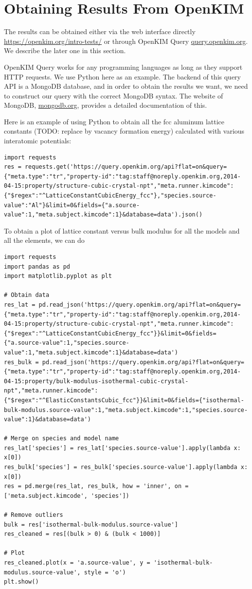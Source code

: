 \documentclass[%
 reprint,
 nofootinbib,
 amsmath,amssymb,
 aps,
]{revtex4-1}
\begin{document}
\section{Obtaining Results From OpenKIM}
\label{app:data}
The results can be obtained either via the web interface directly \url{https://openkim.org/intro-tests/} or through OpenKIM Query \url{query.openkim.org}.
We describe the later one in this section.

OpenKIM Query works for any programming languages as long as they support HTTP requests.
We use Python here as an example.
The backend of this query API is a MongoDB database, and in order to obtain the results we want, we need to construct our query with the correct MongoDB syntax.
The website of MongoDB, \url{mongodb.org}, provides a detailed documentation of this.

Here is an example of using Python to obtain all the fcc aluminum lattice constants (TODO: replace by vacancy formation energy) calculated with various interatomic potentials:
\begin{lstlisting}
import requests
res = requests.get('https://query.openkim.org/api?flat=on&query={"meta.type":"tr","property-id":"tag:staff@noreply.openkim.org,2014-04-15:property/structure-cubic-crystal-npt","meta.runner.kimcode":{"$regex":"^LatticeConstantCubicEnergy_fcc"},"species.source-value":"Al"}&limit=0&fields={"a.source-value":1,"meta.subject.kimcode":1}&database=data').json()
\end{lstlisting}

To obtain a plot of lattice constant versus bulk modulus for all the models and all the elements, we can do
\begin{lstlisting}
import requests
import pandas as pd
import matplotlib.pyplot as plt

# Obtain data
res_lat = pd.read_json('https://query.openkim.org/api?flat=on&query={"meta.type":"tr","property-id":"tag:staff@noreply.openkim.org,2014-04-15:property/structure-cubic-crystal-npt","meta.runner.kimcode":{"$regex":"^LatticeConstantCubicEnergy_fcc"}}&limit=0&fields={"a.source-value":1,"species.source-value":1,"meta.subject.kimcode":1}&database=data')
res_bulk = pd.read_json('https://query.openkim.org/api?flat=on&query={"meta.type":"tr","property-id":"tag:staff@noreply.openkim.org,2014-04-15:property/bulk-modulus-isothermal-cubic-crystal-npt","meta.runner.kimcode":{"$regex":"^ElasticConstantsCubic_fcc"}}&limit=0&fields={"isothermal-bulk-modulus.source-value":1,"meta.subject.kimcode":1,"species.source-value":1}&database=data')

# Merge on species and model name
res_lat['species'] = res_lat['species.source-value'].apply(lambda x: x[0])
res_bulk['species'] = res_bulk['species.source-value'].apply(lambda x: x[0])
res = pd.merge(res_lat, res_bulk, how = 'inner', on = ['meta.subject.kimcode', 'species'])

# Remove outliers
bulk = res['isothermal-bulk-modulus.source-value']
res_cleaned = res[(bulk > 0) & (bulk < 1000)]

# Plot
res_cleaned.plot(x = 'a.source-value', y = 'isothermal-bulk-modulus.source-value', style = 'o')
plt.show()
\end{lstlisting}
\end{document}
